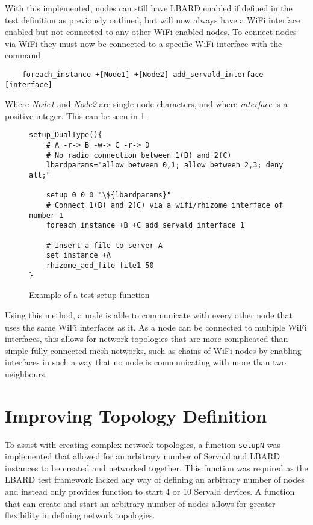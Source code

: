 With this implemented, nodes can still have LBARD enabled if defined in the test definition as previously outlined, but will now always have a WiFi interface enabled but not connected to any other WiFi enabled nodes.
To connect nodes via WiFi they must now be connected to a specific WiFi interface with the command
\begin{lstlisting}
    foreach_instance +[Node1] +[Node2] add_servald_interface [interface]
\end{lstlisting}
Where \emph{Node1} and \emph{Node2} are single node characters, and where \emph{interface} is a positive integer.
This can be seen in \figurename{ \ref{fig:definingInterfaces}}.

\lstset{language=bash,
showstringspaces=false,
numbers=left,
}

\begin{figure}[h!]
    \begin{centering}
        \begin{lstlisting}[breaklines, frame=single]
setup_DualType(){
    # A -r-> B -w-> C -r-> D
    # No radio connection between 1(B) and 2(C)
    lbardparams="allow between 0,1; allow between 2,3; deny all;"

    setup 0 0 0 "\${lbardparams}"
    # Connect 1(B) and 2(C) via a wifi/rhizome interface of number 1
    foreach_instance +B +C add_servald_interface 1

    # Insert a file to server A
    set_instance +A
    rhizome_add_file file1 50
}
        \end{lstlisting}
        \caption{Example of a test setup function}
        \label{fig:definingInterfaces}
    \end{centering}
\end{figure}

Using this method, a node is able to communicate with every other node that uses the same WiFi interfaces as it.
As a node can be connected to multiple WiFi interfaces, this allows for network topologies that are more complicated than simple fully-connected mesh networks, such as chains of WiFi nodes by enabling interfaces in such a way that no node is communicating with more than two neighbours.


\section{Improving Topology Definition}
To assist with creating complex network topologies, a function \texttt{setupN} was implemented that allowed for an arbitrary number of Servald and LBARD instances to be created and networked together.
This function was required as the LBARD test framework lacked any way of defining an arbitrary number of nodes and instead only provides function to start 4 or 10 Servald devices.
A function that can create and start an arbitrary number of nodes allows for greater flexibility in defining network topologies.


